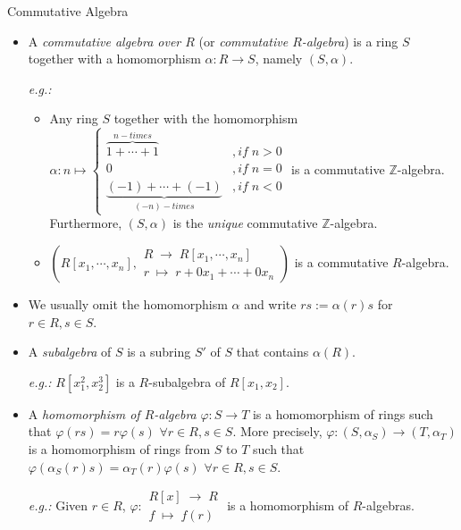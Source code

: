 \begin{definition}{Commutative Algebra}
\begin{itemize}
    \item A \textit{commutative algebra over $R$} (or \textit{commutative $R$-algebra}) is a ring $S$ together with a homomorphism $\alpha: R \to S$, namely $(S,\alpha)$.

    \noindent\textit{e.g.:} \begin{itemize}
        \item Any ring $S$ together with the homomorphism $\alpha: n \mapsto \begin{cases}
            \overbrace{1+ \cdots +1}^{n-times} &,if\;n>0\\
            0 &,if\; n=0\\
            \underbrace{(-1) + \cdots + (-1)}_{(-n)-times} &,if \;n<0
        \end{cases}$ is a commutative $\mathbb{Z}$-algebra. Furthermore, $(S,\alpha)$ is the \textit{unique} commutative $\mathbb{Z}$-algebra.

        \item $(R[x_1,\cdots,x_n] , \substack{R \;\to\; R[x_1,\cdots,x_n]\\
        r \;\mapsto\; r+ 0x_1 +\cdots+ 0x_n})$ is a commutative $R$-algebra.
    \end{itemize}

    \item We usually omit the homomorphism $\alpha$ and write $rs:= \alpha(r) s$ for $r\in R,s\in S$.
    \item A \textit{subalgebra} of $S$ is a subring $S'$ of $S$ that contains $\alpha(R)$.

    \noindent\textit{e.g.:} $R[x_1^2,x_2^3]$ is a $R$-subalgebra of $R[x_1,x_2]$.
    
    \item A \textit{homomorphism of $R$-algebra} $\varphi:S \to T$ is a homomorphism of rings such that $\varphi(rs) = r\varphi(s)$ $\forall r\in R,s\in S$. More precisely, $\varphi: (S,\alpha_S) \to (T,\alpha_T)$ is a homomorphism of rings from $S$ to $T$ such that $\varphi (\alpha_S (r) s) =\alpha_T (r)\varphi(s)$ $\forall r\in R,s\in S$.

    \noindent\textit{e.g.:} Given $r\in R$, $\varphi : \substack{R[x]\;\to\; R\\
    f \;\mapsto\; f(r)}$ is a homomorphism of $R$-algebras.
\end{itemize}
\end{definition}

